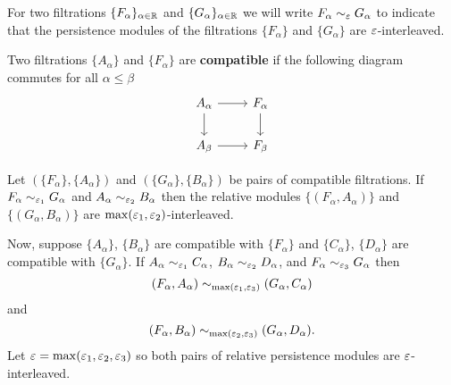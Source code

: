 


For two filtrations $\{F_\alpha\}_{\alpha\in\mathbb{R}}$ and $\{G_\alpha\}_{\alpha\in\mathbb{R}}$ we will write $F_\alpha\sim_\varepsilon G_\alpha$ to indicate that the persistence modules of the filtrations $\{F_\alpha\}$ and $\{G_\alpha\}$ are $\varepsilon$-interleaved.

\begin{definition}
  Two filtrations $\{A_\alpha\}$ and $\{F_\alpha\}$ are \textbf{compatible} if the following diagram commutes for all $\alpha\leq\beta$
  \begin{equation}\begin{tikzcd}
    A_\alpha\arrow{r}\arrow{d} &
    F_\alpha\arrow{d} \\
    A_\beta\arrow{r} &
    F_\beta
  \end{tikzcd}\end{equation}
\end{definition}

\begin{theorem}
  Let $(\{F_\alpha\}, \{A_\alpha\})$ and $(\{G_\alpha\}, \{B_\alpha\})$ be pairs of compatible filtrations.
  If $F_\alpha\sim_{\varepsilon_1} G_\alpha$ and $A_\alpha\sim_{\varepsilon_2} B_\alpha$ then the relative modules $\{(F_\alpha, A_\alpha)\}$ and $\{(G_\alpha, B_\alpha)\}$ are $\max(\varepsilon_1, \varepsilon_2)$-interleaved.
\end{theorem}

Now, suppose $\{A_\alpha\}$, $\{B_\alpha\}$ are compatible with $\{F_\alpha\}$ and $\{C_\alpha\}$, $\{D_\alpha\}$ are compatible with $\{G_\alpha\}$.
If $A_\alpha\sim_{\varepsilon_1} C_\alpha$, $B_\alpha\sim_{\varepsilon_2} D_\alpha$, and $F_\alpha\sim_{\varepsilon_3} G_\alpha$ then
\[ (F_\alpha, A_\alpha)\sim_{\max(\varepsilon_1,\varepsilon_3)} (G_\alpha, C_\alpha)\]
and
\[ (F_\alpha, B_\alpha)\sim_{\max(\varepsilon_2,\varepsilon_3)} (G_\alpha, D_\alpha).\]
Let $\varepsilon = \max(\varepsilon_1, \varepsilon_2, \varepsilon_3)$ so both pairs of relative persistence modules are $\varepsilon$-interleaved.



